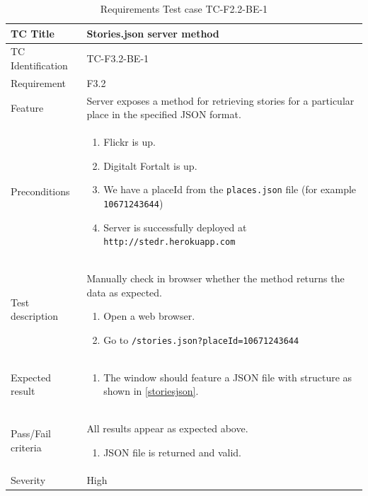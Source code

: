 \documentclass[11pt]{book}
\begin{document}
\begin{table}
  \begin{tabular}{| p{3cm} | p{9.5cm} |} \hline 
    TC Title              & Stories.json server method \\ \hline 
    TC Identification     & TC-F3.2-BE-1 \\ \hline 
    Requirement           & F3.2 \\ \hline 
    Feature               & Server exposes a method for retrieving stories for a particular place in the specified JSON format. \\ \hline 
    Preconditions         & \begin{enumerate}
                              \item Flickr is up.
                              \item Digitalt Fortalt is up.
                              \item We have a placeId from the \texttt{places.json} file (for example \texttt{10671243644})
                              \item Server is successfully deployed at \texttt{http://stedr.herokuapp.com}
                            \end{enumerate} \\ \hline 

    Test description      & Manually check in browser whether the method returns the data as expected.

                            \begin{enumerate}
                              \item Open a web browser.
                              \item Go to \texttt{/stories.json?placeId=10671243644}
                            \end{enumerate} \\ \hline 
    Expected result       & \begin{enumerate}
                              \item The window should feature a JSON file with structure as shown in \ref{storiesjson}.
                            \end{enumerate} \\ \hline 
    Pass/Fail criteria    & All results appear as expected above.
                            \begin{enumerate}
                              \item JSON file is returned and valid.
                            \end{enumerate} \\ \hline 
    Severity              & High \\ \hline 
  \end{tabular}
  \caption{Requirements Test case TC-F2.2-BE-1}
  \label{tab:TCF3.2BE1}
\end{table}
\end{document}
